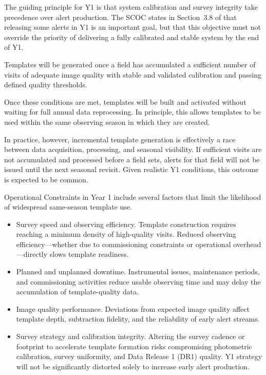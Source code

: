 The guiding principle for Y1 is that system calibration and survey integrity take precedence over alert production.
The SCOC states in Section~3.8 of  that releasing some alerts in Y1 is an important goal, but that this objective must not override the priority of delivering a fully calibrated and stable system by the end of Y1.

Templates will be generated once a field has accumulated a sufficient number of visits of adequate image quality with stable and validated calibration and passing defined quality thresholds.

Once these conditions are met, templates will be built and activated without waiting for full annual data reprocessing.
In principle, this allows templates to be used within the same observing season in which they are created.

In practice, however, incremental template generation is effectively a race between data acquisition, processing, and seasonal visibility.
If sufficient visits are not accumulated and processed before a field sets, alerts for that field will not be issued until the next seasonal revisit.
Given realistic Y1 conditions, this outcome is expected to be common.

Operational Constraints in Year 1 include several factors that limit the likelihood of widespread same-season template use.

\begin{itemize}
\item Survey speed and observing efficiency.
Template construction requires reaching a minimum density of high-quality visits.
Reduced observing efficiency—whether due to commissioning constraints or operational overhead—directly slows template readiness.

\item Planned and unplanned downtime.
Instrumental issues, maintenance periods, and commissioning activities reduce usable observing time and may delay the accumulation of template-quality data.

\item Image quality performance.
Deviations from expected image quality affect template depth, subtraction fidelity, and the reliability of early alert streams.

\item Survey strategy and calibration integrity.
Altering the survey cadence or footprint to accelerate template formation risks compromising photometric calibration, survey uniformity, and Data Release 1 (DR1) quality.
Y1 strategy will not be significantly distorted solely to increase early alert production.
\end{itemize}

